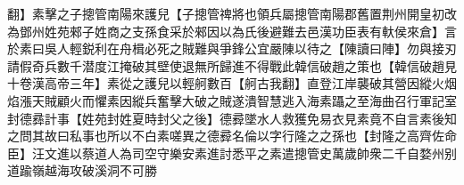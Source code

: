 翻】素擊之子摠管南陽來護兒【子摠管禆將也領兵屬摠管南陽郡舊置荆州開皇初改為鄧州姓苑郲子姓商之支孫食采於郲因以為氏後避難去邑漢功臣表有軑侯來倉】言於素曰吳人輕鋭利在舟楫必死之賊難與爭鋒公宜嚴陳以待之【陳讀曰陣】勿與接刃請假奇兵數千潜度江掩破其壁使退無所歸進不得戰此韓信破趙之策也【韓信破趙見十卷漢高帝三年】素從之護兒以輕舸數百【舸古我翻】直登江岸襲破其營因縱火烟焰漲天賊顧火而懼素因縱兵奮擊大破之賊遂潰智慧逃入海素躡之至海曲召行軍記室封德彞計事【姓苑封姓夏時封父之後】德彛墜水人救獲免易衣見素竟不自言素後知之問其故曰私事也所以不白素嗟異之德彛名倫以字行隆之之孫也【封隆之高齊佐命臣】汪文進以蔡道人為司空守樂安素進討悉平之素遣摠管史萬歲帥衆二千自婺州别道踰嶺越海攻破溪洞不可勝